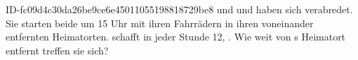 \begin{exercise}
      {ID-fc09d4c30da26be9ce6e45011055198818729be8}
      {\xya{} und \xyb}
  \ifproblem\problem
    \xya{} und \xyb{} haben sich verabredet. Sie starten beide um 15 Uhr mit ihren
    Fahrrädern in ihren  voneinander entfernten Heimatorten. \xya{} schafft
    in jeder Stunde 12, \xyb{} . Wie weit von \xya s Heimatort entfernt
    treffen sie sich?
  \fi
\end{exercise}
